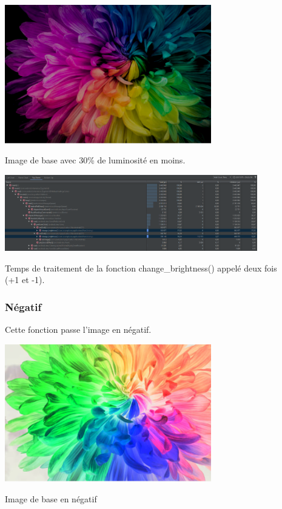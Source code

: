 \documentclass{article}
\begin{document}
\begin{center} 
    \includegraphics[width=9cm]{../Image_fonctions/LuminositeMoins3}

    Image de base avec 30\% de luminosité en moins.
\end{center}
\bigbreak

\begin{center} 
    \includegraphics[width=11cm]{../Image_temps/TempsChangeBrightness}

    Temps de traitement de la fonction change\_brightness() appelé deux fois\\(+1 et -1).
\end{center}
\bigbreak

\subsubsection{Négatif}
Cette fonction passe l'image en négatif.
\bigbreak

\begin{center} 
    \includegraphics[width=9cm]{../Image_fonctions/Negatif}
    \bigbreak

    Image de base en négatif
\end{center}
\end{document}

